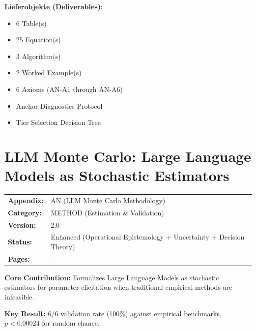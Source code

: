 \begin{tcolorbox}[
    colback=orange!5!white,
    colframe=orange!75!black,
    title={\textbf{Appendix Scope: Ziel / In-Scope / Out-of-Scope / Constraints}},
    fonttitle=\bfseries
]
\textbf{Lieferobjekte (Deliverables):}
\begin{itemize}[nosep]
    \item 6 Table(s)
    \item 25 Equation(s)
    \item 3 Algorithm(s)
    \item 2 Worked Example(s)
    \item 6 Axioms (AN-A1 through AN-A6)
    \item Anchor Diagnostics Protocol
    \item Tier Selection Decision Tree
\end{itemize}

\end{tcolorbox}


\section{LLM Monte Carlo: Large Language Models as Stochastic Estimators}
\label{app:llm-monte-carlo}


\begin{tcolorbox}[colback=blue!5!white, colframe=blue!75!black,
    title=\textbf{Appendix LLM1: METHOD-LLMMC}]

\begin{tabular}{@{}ll@{}}
\textbf{Appendix:} & AN (LLM Monte Carlo Methodology) \\
\textbf{Category:} & METHOD (Estimation \& Validation) \\
\textbf{Version:} & 2.0 \\
\textbf{Status:} & Enhanced (Operational Epistemology + Uncertainty + Decision Theory) \\
\textbf{Pages:} & \pageref{app:llm-monte-carlo}--\pageref{sec:AN-footer} \\
\end{tabular}

\tcblower

\textbf{Core Contribution:} Formalizes Large Language Models as stochastic estimators
for parameter elicitation when traditional empirical methods are infeasible.

\textbf{Key Result:} 6/6 validation rate (100\%) against empirical benchmarks,
$p < 0.00024$ for random chance.

\end{tcolorbox}

